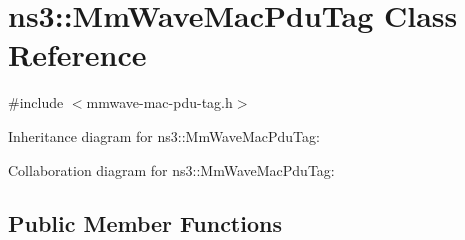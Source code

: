 \hypertarget{classns3_1_1MmWaveMacPduTag}{}\section{ns3\+:\+:Mm\+Wave\+Mac\+Pdu\+Tag Class Reference}
\label{classns3_1_1MmWaveMacPduTag}


{\ttfamily \#include $<$mmwave-\/mac-\/pdu-\/tag.\+h$>$}



Inheritance diagram for ns3\+:\+:Mm\+Wave\+Mac\+Pdu\+Tag\+:


Collaboration diagram for ns3\+:\+:Mm\+Wave\+Mac\+Pdu\+Tag\+:
\subsection*{Public Member Functions}
